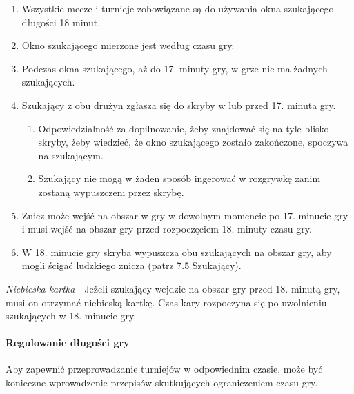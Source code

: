 \documentclass[12pt]{article}
\begin{document}
\begin{enumerate}
	\item Wszystkie mecze i turnieje zobowiązane są do używania okna
	      szukającego długości 18 minut.

	\item Okno szukającego mierzone jest według czasu gry.

	\item Podczas okna szukającego, aż do 17. minuty gry, w grze nie ma żadnych
	      szukających.

	\item Szukający z obu drużyn zgłasza się do skryby w lub przed 17. minuta
	      gry.
	      \begin{enumerate}
		      \item Odpowiedzialność za dopilnowanie, żeby znajdować się na tyle blisko
		            skryby, żeby wiedzieć, że okno szukającego zostało zakończone, spoczywa
		            na szukającym.

		      \item Szukający nie mogą w żaden sposób ingerować w rozgrywkę zanim
		            zostaną wypuszczeni przez skrybę.
	      \end{enumerate}

	\item Znicz może wejść na obszar w gry w dowolnym momencie po 17. minucie
	      gry i musi wejść na obszar gry przed rozpoczęciem 18. minuty czasu gry.

	\item W 18. minucie gry skryba wypuszcza obu szukających na obszar gry, aby
	      mogli ścigać ludzkiego znicza (patrz 7.5 Szukający).
\end{enumerate}

\emph{Niebieska kartka} - Jeżeli szukający wejdzie na obszar gry przed
18. minutą gry, musi on otrzymać niebieską kartkę. Czas kary rozpoczyna
się po uwolnieniu szukających w 18. minucie gry.

\paragraph{Regulowanie długości gry}
Aby zapewnić
przeprowadzanie turniejów w odpowiednim czasie, może być konieczne
wprowadzenie przepisów skutkujących ograniczeniem czasu gry.
\end{document}
